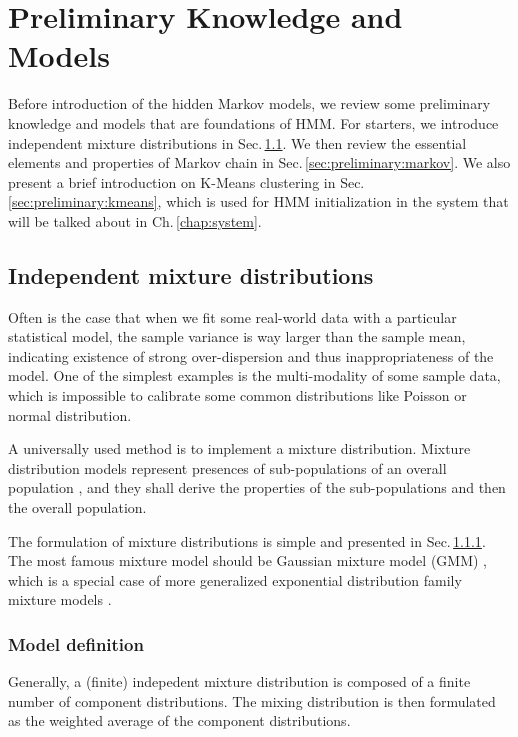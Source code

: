 
\chapter{Preliminary Knowledge and Models}
\label{chap:preliminary}

Before introduction of the hidden Markov models,
we review some preliminary knowledge and models that are foundations of HMM.
For starters, we introduce independent mixture distributions in Sec.\,\ref{sec:preliminary:distribution}.
We then review the essential elements and properties of Markov chain 
in Sec.\,\ref{sec:preliminary:markov}.
We also present a brief introduction on K-Means clustering in Sec.\,\ref{sec:preliminary:kmeans},
which is used for HMM initialization in the system that will be talked about in Ch.\,\ref{chap:system}.


\section{Independent mixture distributions}
\label{sec:preliminary:distribution}
Often is the case that when we fit some real-world data with a particular statistical model,
the sample variance is way larger than the sample mean,
indicating existence of strong over-dispersion and thus inappropriateness of the model.
One of the simplest examples is the multi-modality of some sample data,
which is impossible to calibrate some common distributions like Poisson or normal distribution.

A universally used method  
is to implement a mixture distribution.
Mixture distribution models represent presences of sub-populations of 
an overall population \cite{wiki:mixture},
and they shall derive the properties of the sub-populations and then the overall population.

The formulation of mixture distributions is simple and presented in 
Sec.\,\ref{sec:preliminary:distribution:definition}.
The most famous mixture model should be Gaussian mixture model (GMM) \cite{Behboodian:1970hh},
which is a special case of more generalized 
exponential distribution family mixture models \cite{Hasselblad:1969bk}.


\subsection{Model definition}
\label{sec:preliminary:distribution:definition}
Generally, a (finite) indepedent mixture distribution is composed of 
a finite number of component distributions.
The mixing distribution is then formulated as the weighted average of the component distributions.

